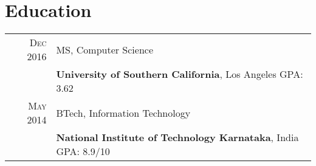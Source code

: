 \section{Education}
\begin{tabular}{rl}

\textsc{Dec 2016} & MS, Computer Science\\
&\textbf{University of Southern California}, Los Angeles\hspace{2.8cm} GPA: 3.62
\\
\textsc{May} 2014 & BTech, Information Technology\\
&\textbf{National Institute of Technology Karnataka}, India\hspace{2cm} GPA: 8.9/10

\end{tabular}
\vspace{5pt}
